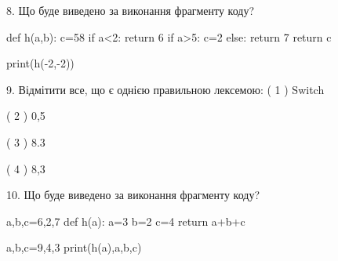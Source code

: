 \documentclass[11pt]{article}
\begin{document}
\vspace{5mm}

8. Що буде виведено за виконання фрагменту коду?

def h(a,b):
    c=58
    if a<2:
        return 6
    if a>5:
         c=2
    else: 
        return 7
    return c

print(h(-2,-2))
\vspace{5mm}

9. %
Відмітити все, що є однією правильною лексемою:
( 1 ) Switch

( 2 ) 0,5

( 3 ) 8.3

( 4 ) 8,3
\vspace{5mm}

10. Що буде виведено за виконання фрагменту коду?

a,b,c=6,2,7
def h(a):
    a=3
    b=2
    c=4
    return a+b+c

a,b,c=9,4,3
print(h(a),a,b,c)
\vspace{5mm}

\newpage
\end{document}
